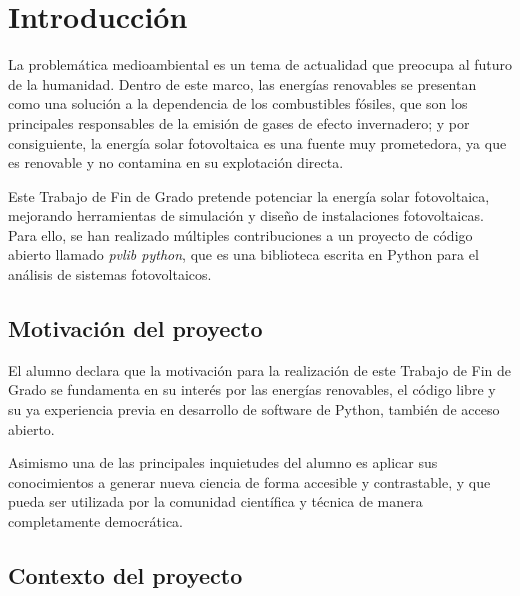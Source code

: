 \chapter{Introducción} \label{chp:intro}

La problemática medioambiental es un tema de actualidad que preocupa al futuro de la humanidad. Dentro de este marco, las energías renovables se presentan como una solución a la dependencia de los combustibles fósiles, que son los principales responsables de la emisión de gases de efecto invernadero; y por consiguiente, la energía solar fotovoltaica es una fuente muy prometedora, ya que es renovable y no contamina en su explotación directa.

Este Trabajo de Fin de Grado pretende potenciar la energía solar fotovoltaica, mejorando herramientas de simulación y diseño de instalaciones fotovoltaicas. Para ello, se han realizado múltiples contribuciones a un proyecto de código abierto llamado \textit{pvlib python}, que es una biblioteca escrita en Python para el análisis de sistemas fotovoltaicos.


\section{Motivación del proyecto} \label{sct:intro:motivacion}

El alumno declara que la motivación para la realización de este Trabajo de Fin de Grado se fundamenta en su interés por las energías renovables, el código libre y su ya experiencia previa en desarrollo de software de Python, también de acceso abierto.

Asimismo una de las principales inquietudes del alumno es aplicar sus conocimientos a generar nueva ciencia de forma accesible y contrastable, y que pueda ser utilizada por la comunidad científica y técnica de manera completamente democrática.


\section{Contexto del proyecto} \label{sct:intro:contexto}

